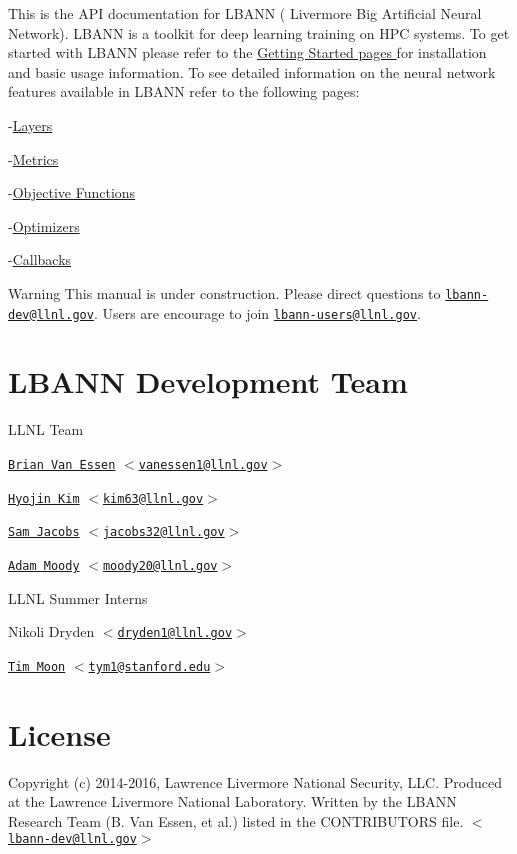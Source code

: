 This is the A\+PI documentation for L\+B\+A\+NN ( Livermore Big Artificial Neural Network). L\+B\+A\+NN is a toolkit for deep learning training on H\+PC systems. To get started with L\+B\+A\+NN please refer to the \hyperlink{getting_started}{Getting Started pages } for installation and basic usage information. To see detailed information on the neural network features available in L\+B\+A\+NN refer to the following pages\+:

-\/\hyperlink{layers}{Layers }

-\/\hyperlink{metrics}{Metrics }

-\/\hyperlink{obj_fn}{Objective Functions }

-\/\hyperlink{optimizers}{Optimizers }

-\/\hyperlink{callbacks}{Callbacks }

\begin{DoxyWarning}{Warning}
This manual is under construction. Please direct questions to \href{mailto:lbann-dev@llnl.gov}{\tt lbann-\/dev@llnl.\+gov}. Users are encourage to join \href{mailto:lbann-users@llnl.gov}{\tt lbann-\/users@llnl.\+gov}.
\end{DoxyWarning}
\hypertarget{index_team}{}\section{L\+B\+A\+N\+N Development Team}\label{index_team}
L\+L\+NL Team
\begin{DoxyItemize}
\item \href{http://people.llnl.gov/vanessen1}{\tt Brian Van Essen} $<$\href{mailto:vanessen1@llnl.gov}{\tt vanessen1@llnl.\+gov}$>$
\item \href{http://people.llnl.gov/kim63}{\tt Hyojin Kim} $<$\href{mailto:kim63@llnl.gov}{\tt kim63@llnl.\+gov}$>$
\item \href{http://people.llnl.gov/jacobs32}{\tt Sam Jacobs} $<$\href{mailto:jacobs32@llnl.gov}{\tt jacobs32@llnl.\+gov}$>$
\item \href{http://people.llnl.gov/moody20}{\tt Adam Moody} $<$\href{mailto:moody20@llnl.gov}{\tt moody20@llnl.\+gov}$>$
\end{DoxyItemize}

L\+L\+NL Summer Interns


\begin{DoxyItemize}
\item Nikoli Dryden $<$\href{mailto:dryden1@llnl.gov}{\tt dryden1@llnl.\+gov}$>$
\item \href{https://web.stanford.edu/~tym1}{\tt Tim Moon} $<$\href{mailto:tym1@stanford.edu}{\tt tym1@stanford.\+edu}$>$
\end{DoxyItemize}\hypertarget{index_license}{}\section{License}\label{index_license}
Copyright (c) 2014-\/2016, Lawrence Livermore National Security, L\+LC. Produced at the Lawrence Livermore National Laboratory. Written by the L\+B\+A\+NN Research Team (B. Van Essen, et al.) listed in the C\+O\+N\+T\+R\+I\+B\+U\+T\+O\+RS file. $<$\href{mailto:lbann-dev@llnl.gov}{\tt lbann-\/dev@llnl.\+gov}$>$

